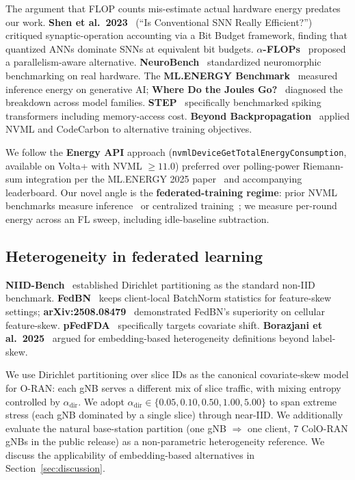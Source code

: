 \documentclass[journal]{IEEEtran}
\newcommand{\alphadir}{\ensuremath{\alpha_{\mathrm{dir}}}}
\begin{document}
The argument that FLOP counts mis-estimate actual hardware energy predates our work. \textbf{Shen et al.\ 2023}~\cite{Shen2023_BitBudget} (``Is Conventional SNN Really Efficient?'') critiqued synaptic-operation accounting via a Bit Budget framework, finding that quantized ANNs dominate SNNs at equivalent bit budgets. \textbf{$\alpha$-FLOPs}~\cite{Asperti2021_alphaFLOPs} proposed a parallelism-aware alternative. \textbf{NeuroBench}~\cite{Yik2025_NeuroBench} standardized neuromorphic benchmarking on real hardware. The \textbf{ML.ENERGY Benchmark}~\cite{Chung2025_MLEnergy} measured inference energy on generative AI; \textbf{Where Do the Joules Go?}~\cite{Chung2026_Joules} diagnosed the breakdown across model families. \textbf{STEP}~\cite{Shen2025_STEP} specifically benchmarked spiking transformers including memory-access cost. \textbf{Beyond Backpropagation}~\cite{Spyra2025_BeyondBackprop} applied NVML and CodeCarbon to alternative training objectives.

We follow the \textbf{Energy API} approach (\lstinline|nvmlDeviceGetTotalEnergyConsumption|, available on Volta+ with NVML $\geq 11.0$) preferred over polling-power Riemann-sum integration per the ML.ENERGY 2025 paper~\cite{Chung2025_MLEnergy} and accompanying leaderboard. Our novel angle is the \textbf{federated-training regime}: prior NVML benchmarks measure inference~\cite{Yik2025_NeuroBench, Chung2025_MLEnergy} or centralized training~\cite{arXiv2509_05276_SpikingBrain, Spyra2025_BeyondBackprop}; we measure per-round energy across an FL sweep, including idle-baseline subtraction.

\subsection{Heterogeneity in federated learning}

\textbf{NIID-Bench}~\cite{Li2022_NIIDBench} established Dirichlet partitioning as the standard non-IID benchmark. \textbf{FedBN}~\cite{Li2021_FedBN} keeps client-local BatchNorm statistics for feature-skew settings; \textbf{arXiv:2508.08479}~\cite{arXiv2508_08479} demonstrated FedBN's superiority on cellular feature-skew. \textbf{pFedFDA}~\cite{pFedFDA2024} specifically targets covariate shift. \textbf{Borazjani et al.\ 2025}~\cite{Borazjani2025} argued for embedding-based heterogeneity definitions beyond label-skew.

We use Dirichlet partitioning over slice IDs as the canonical covariate-skew model for O-RAN: each gNB serves a different mix of slice traffic, with mixing entropy controlled by \alphadir. We adopt $\alphadir\in\{0.05, 0.10, 0.50, 1.00, 5.00\}$ to span extreme stress (each gNB dominated by a single slice) through near-IID. We additionally evaluate the natural base-station partition (one gNB $\Rightarrow$ one client, 7 ColO-RAN gNBs in the public release) as a non-parametric heterogeneity reference. We discuss the applicability of embedding-based alternatives in Section~\ref{sec:discussion}.
\end{document}
